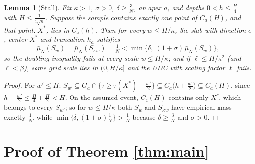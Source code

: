 \documentclass[11pt]{article}
\newtheorem{lemma}[theorem]{Lemma}
\newcommand{\emp}{\bar\mu_N}
\begin{document}
\begin{lemma}[Stall]\label{lem:stall}
Fix $\kappa>1$, $\sigma>0$, $\delta\ge\frac3N$, an apex $a$, and depths
$0<h\le\frac H4$ with $H\le\frac1{4\sqrt n}$.  Suppose the sample contains
exactly one point of $C_a(H)$, and that point, $X^*$, lies in $C_a(h)$.  Then
for every $w\le H/\kappa$, the slab with direction $e$, center $X^*$ and
truncation $h_a$ satisfies
\[
\emp(S_w)=\emp(S_{\kappa w})=\tfrac1N
<\min\bigl\{\delta,\ (1+\sigma)\,\emp(S_w)\bigr\},
\]
so the doubling inequality fails at every scale $w\le H/\kappa$; and if
$\ell\le H/\kappa^2$ (and $\ell<\beta$), some grid scale lies in
$(0,H/\kappa]$ and the UDC with scaling factor $\ell$ fails.
\end{lemma}

\begin{proof}
For $w'\le H$: $S_{w'}\subseteq G_a\cap\{\tau\ge\tau(X^*)-\frac{w'}2\}
\subseteq C_a\bigl(h+\frac{w'}2\bigr)\subseteq C_a(H)$, since
$h+\frac{w'}2\le\frac H4+\frac H2<H$.  On the assumed event, $C_a(H)$ contains
only $X^*$, which belongs to every $S_{w'}$; so for $w\le H/\kappa$ both
$S_w$ and $S_{\kappa w}$ have empirical mass exactly $\frac1N$, while
$\min\{\delta,(1+\sigma)\frac1N\}>\frac1N$ because $\delta\ge\frac3N$ and
$\sigma>0$.
\end{proof}

\section{Proof of Theorem \ref{thm:main}}\label{sec:proof}
\end{document}

